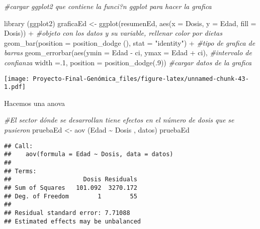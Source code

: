 \documentclass[
]{article}
\newenvironment{Shaded}{\begin{snugshade}}{\end{snugshade}}
\newcommand{\AttributeTok}[1]{\textcolor[rgb]{0.77,0.63,0.00}{#1}}
\newcommand{\CommentTok}[1]{\textcolor[rgb]{0.56,0.35,0.01}{\textit{#1}}}
\newcommand{\DecValTok}[1]{\textcolor[rgb]{0.00,0.00,0.81}{#1}}
\newcommand{\FunctionTok}[1]{\textcolor[rgb]{0.00,0.00,0.00}{#1}}
\newcommand{\NormalTok}[1]{#1}
\newcommand{\OtherTok}[1]{\textcolor[rgb]{0.56,0.35,0.01}{#1}}
\newcommand{\SpecialCharTok}[1]{\textcolor[rgb]{0.00,0.00,0.00}{#1}}
\newcommand{\StringTok}[1]{\textcolor[rgb]{0.31,0.60,0.02}{#1}}
\begin{document}
\begin{Shaded}
\begin{Highlighting}[]
\CommentTok{\#cargar ggplot2 que contiene la funci?n ggplot para hacer la grafica}

\FunctionTok{library}\NormalTok{ (ggplot2) }
\NormalTok{graficaEd }\OtherTok{\textless{}{-}} \FunctionTok{ggplot}\NormalTok{(resumenEd, }\FunctionTok{aes}\NormalTok{(}\AttributeTok{x =}\NormalTok{ Dosis, }\AttributeTok{y =}\NormalTok{ Edad, }\AttributeTok{fill =}\NormalTok{ Dosis)) }\SpecialCharTok{+} \CommentTok{\#objeto con los datos y su variable, rellenar color por dietas}
    \FunctionTok{geom\_bar}\NormalTok{(}\AttributeTok{position =} \FunctionTok{position\_dodge}\NormalTok{ (), }\AttributeTok{stat =} \StringTok{"identity"}\NormalTok{) }\SpecialCharTok{+} \CommentTok{\#tipo de grafica de barras}
    \FunctionTok{geom\_errorbar}\NormalTok{(}\FunctionTok{aes}\NormalTok{(}\AttributeTok{ymin =}\NormalTok{ Edad }\SpecialCharTok{{-}}\NormalTok{ ci, }\AttributeTok{ymax =}\NormalTok{ Edad }\SpecialCharTok{+}\NormalTok{ ci), }\CommentTok{\#intervalo de confianza}
                  \AttributeTok{width =}\NormalTok{.}\DecValTok{1}\NormalTok{, }
                  \AttributeTok{position =} \FunctionTok{position\_dodge}\NormalTok{(.}\DecValTok{9}\NormalTok{)) }\CommentTok{\#cargar datos de la grafica}
\end{Highlighting}
\end{Shaded}

\texttt{[image: Proyecto-Final-Genómica\_files/figure-latex/unnamed-chunk-43-1.pdf]}

Hacemos una anova

\begin{Shaded}
\begin{Highlighting}[]
\CommentTok{\#El sector dónde se desarrollan tiene efectos en el número de dosis que se pusieron}
\NormalTok{pruebaEd }\OtherTok{\textless{}{-}} \FunctionTok{aov}\NormalTok{ (Edad }\SpecialCharTok{\textasciitilde{}}\NormalTok{ Dosis , datos)}
\NormalTok{pruebaEd}
\end{Highlighting}
\end{Shaded}

\begin{verbatim}
## Call:
##    aov(formula = Edad ~ Dosis, data = datos)
## 
## Terms:
##                    Dosis Residuals
## Sum of Squares   101.092  3270.172
## Deg. of Freedom        1        55
## 
## Residual standard error: 7.71088
## Estimated effects may be unbalanced
\end{verbatim}
\end{document}
